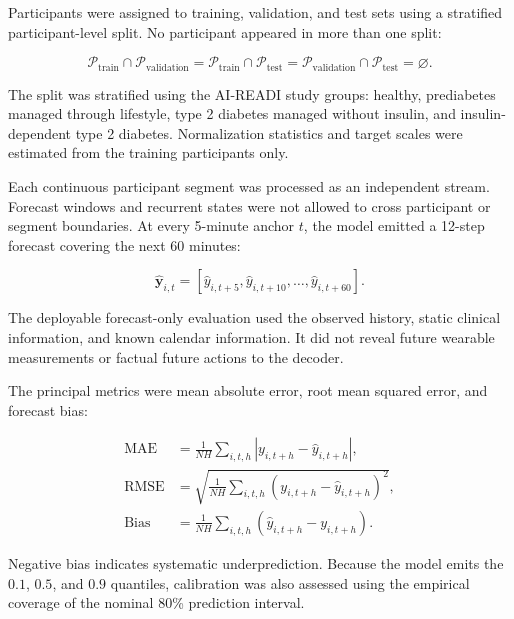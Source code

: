 Participants were assigned to training, validation, and test sets using a
stratified participant-level split. No participant appeared in more than one
split:

\begin{equation}
\mathcal{P}_{\mathrm{train}}
\cap
\mathcal{P}_{\mathrm{validation}}
=
\mathcal{P}_{\mathrm{train}}
\cap
\mathcal{P}_{\mathrm{test}}
=
\mathcal{P}_{\mathrm{validation}}
\cap
\mathcal{P}_{\mathrm{test}}
=
\varnothing.
\end{equation}

The split was stratified using the AI-READI study groups: healthy,
prediabetes managed through lifestyle, type 2 diabetes managed without
insulin, and insulin-dependent type 2 diabetes. Normalization statistics and
target scales were estimated from the training participants only.

Each continuous participant segment was processed as an independent stream.
Forecast windows and recurrent states were not allowed to cross participant or
segment boundaries. At every 5-minute anchor $t$, the model emitted a
12-step forecast covering the next 60 minutes:

\begin{equation}
\hat{\mathbf{y}}_{i,t}
=
\left[
\hat{y}_{i,t+5},
\hat{y}_{i,t+10},
\ldots,
\hat{y}_{i,t+60}
\right].
\end{equation}

The deployable forecast-only evaluation used the observed history, static
clinical information, and known calendar information. It did not reveal future
wearable measurements or factual future actions to the decoder.

The principal metrics were mean absolute error, root mean squared error, and
forecast bias:

\begin{align}
\mathrm{MAE}
&=
\frac{1}{NH}
\sum_{i,t,h}
\left|
y_{i,t+h}-\hat{y}_{i,t+h}
\right|,
\\
\mathrm{RMSE}
&=
\sqrt{
\frac{1}{NH}
\sum_{i,t,h}
\left(
y_{i,t+h}-\hat{y}_{i,t+h}
\right)^2
},
\\
\mathrm{Bias}
&=
\frac{1}{NH}
\sum_{i,t,h}
\left(
\hat{y}_{i,t+h}-y_{i,t+h}
\right).
\end{align}

Negative bias indicates systematic underprediction. Because the model emits
the $0.1$, $0.5$, and $0.9$ quantiles, calibration was also assessed using the
empirical coverage of the nominal 80\% prediction interval.


